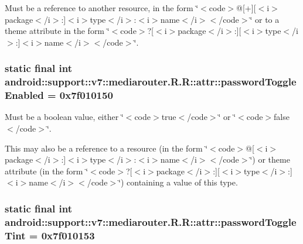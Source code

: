 Must be a reference to another resource, in the form \char`\"{}$<$code$>$@\mbox{[}+\mbox{]}\mbox{[}$<$i$>$package$<$/i$>$:\mbox{]}$<$i$>$type$<$/i$>$:$<$i$>$name$<$/i$>$$<$/code$>$\char`\"{} or to a theme attribute in the form \char`\"{}$<$code$>$?\mbox{[}$<$i$>$package$<$/i$>$:\mbox{]}\mbox{[}$<$i$>$type$<$/i$>$:\mbox{]}$<$i$>$name$<$/i$>$$<$/code$>$\char`\"{}. \hypertarget{classandroid_1_1support_1_1v7_1_1mediarouter_1_1_r_1_1attr_f23cd34b65cca03901bef44db634a351}{
\subsubsection[{passwordToggleEnabled}]{\setlength{\rightskip}{0pt plus 5cm}static final int android::support::v7::mediarouter.R.R::attr::passwordToggleEnabled = 0x7f010150}}
\label{classandroid_1_1support_1_1v7_1_1mediarouter_1_1_r_1_1attr_f23cd34b65cca03901bef44db634a351}


Must be a boolean value, either \char`\"{}$<$code$>$true$<$/code$>$\char`\"{} or \char`\"{}$<$code$>$false$<$/code$>$\char`\"{}. 

This may also be a reference to a resource (in the form \char`\"{}$<$code$>$@\mbox{[}$<$i$>$package$<$/i$>$:\mbox{]}$<$i$>$type$<$/i$>$:$<$i$>$name$<$/i$>$$<$/code$>$\char`\"{}) or theme attribute (in the form \char`\"{}$<$code$>$?\mbox{[}$<$i$>$package$<$/i$>$:\mbox{]}\mbox{[}$<$i$>$type$<$/i$>$:\mbox{]}$<$i$>$name$<$/i$>$$<$/code$>$\char`\"{}) containing a value of this type. \hypertarget{classandroid_1_1support_1_1v7_1_1mediarouter_1_1_r_1_1attr_0f81eb710b95ea7bf3b1059161ef0514}{
\subsubsection[{passwordToggleTint}]{\setlength{\rightskip}{0pt plus 5cm}static final int android::support::v7::mediarouter.R.R::attr::passwordToggleTint = 0x7f010153}}
\label{classandroid_1_1support_1_1v7_1_1mediarouter_1_1_r_1_1attr_0f81eb710b95ea7bf3b1059161ef0514}



